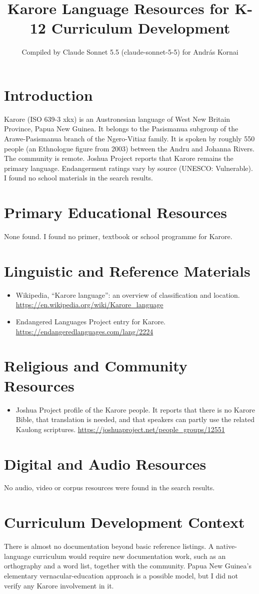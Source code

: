 \documentclass[12pt]{article}
\title{Karore Language Resources for K-12 Curriculum Development}
\author{Compiled by Claude Sonnet 5.5 (claude-sonnet-5-5) for Andr\'as Kornai}
\date{}
\begin{document}
\maketitle

\section{Introduction}
Karore (ISO 639-3 xkx) is an Austronesian language of West New Britain Province, Papua New Guinea. It belongs to the Pasismanua subgroup of the Arawe-Pasismanua branch of the Ngero-Vitiaz family. It is spoken by roughly 550 people (an Ethnologue figure from 2003) between the Andru and Johanna Rivers. The community is remote. Joshua Project reports that Karore remains the primary language. Endangerment ratings vary by source (UNESCO: Vulnerable). I found no school materials in the search results.

\section{Primary Educational Resources}
None found. I found no primer, textbook or school programme for Karore.

\section{Linguistic and Reference Materials}
\begin{itemize}
\item Wikipedia, ``Karore language'': an overview of classification and location. \url{https://en.wikipedia.org/wiki/Karore_language}
\item Endangered Languages Project entry for Karore. \url{https://endangeredlanguages.com/lang/2224}
\end{itemize}

\section{Religious and Community Resources}
\begin{itemize}
\item Joshua Project profile of the Karore people. It reports that there is no Karore Bible, that translation is needed, and that speakers can partly use the related Kaulong scriptures. \url{https://joshuaproject.net/people_groups/12551}
\end{itemize}

\section{Digital and Audio Resources}
No audio, video or corpus resources were found in the search results.

\section{Curriculum Development Context}
There is almost no documentation beyond basic reference listings. A native-language curriculum would require new documentation work, such as an orthography and a word list, together with the community. Papua New Guinea's elementary vernacular-education approach is a possible model, but I did not verify any Karore involvement in it.
\end{document}
